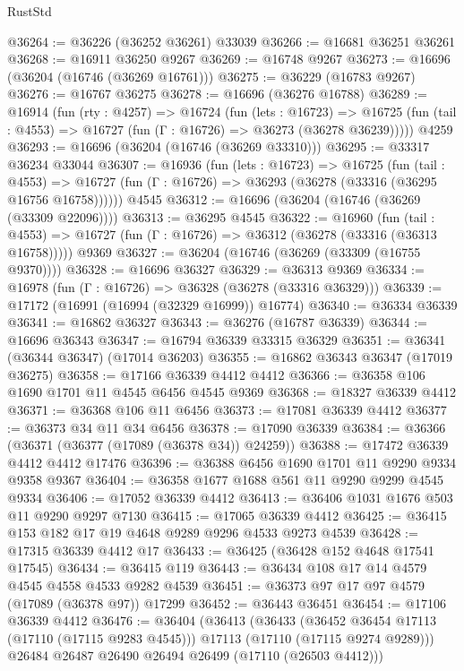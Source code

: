 \begin{lexlean}{RustStd}
\begin{coremodule}
@36264 := @36226 (@36252 @36261) @33039
@36266 := @16681 @36251 @36261
@36268 := @16911 @36250 @9267
@36269 := @16748 @9267
@36273 := @16696 (@36204 (@16746 (@36269 @16761)))
@36275 := @36229 (@16783 @9267)
@36276 := @16767 @36275
@36278 := @16696 (@36276 @16788)
@36289 := @16914
    (fun (rty : @4257) =>
    @16724
      (fun (lets : @16723) =>
      @16725 (fun (tail : @4553) => @16727 (fun (Γ : @16726) => @36273 (@36278 @36239)))))
    @4259
@36293 := @16696 (@36204 (@16746 (@36269 @33310)))
@36295 := @33317 @36234 @33044
@36307 := @16936
    (fun (lets : @16723) =>
    @16725
      (fun (tail : @4553) =>
      @16727 (fun (Γ : @16726) => @36293 (@36278 (@33316 (@36295 @16756 @16758))))))
    @4545
@36312 := @16696 (@36204 (@16746 (@36269 (@33309 @22096))))
@36313 := @36295 @4545
@36322 := @16960
    (fun (tail : @4553) => @16727 (fun (Γ : @16726) => @36312 (@36278 (@33316 (@36313 @16758)))))
    @9369
@36327 := @36204 (@16746 (@36269 (@33309 (@16755 @9370))))
@36328 := @16696 @36327
@36329 := @36313 @9369
@36334 := @16978 (fun (Γ : @16726) => @36328 (@36278 (@33316 @36329)))
@36339 := @17172 (@16991 (@16994 (@32329 @16999)) @16774)
@36340 := @36334 @36339
@36341 := @16862 @36327
@36343 := @36276 (@16787 @36339)
@36344 := @16696 @36343
@36347 := @16794 @36339 @33315 @36329
@36351 := @36341 (@36344 @36347) (@17014 @36203)
@36355 := @16862 @36343 @36347 (@17019 @36275)
@36358 := @17166 @36339 @4412 @4412
@36366 := @36358 @106 @1690 @1701 @11 @4545 @6456 @4545 @9369
@36368 := @18327 @36339 @4412
@36371 := @36368 @106 @11 @6456
@36373 := @17081 @36339 @4412
@36377 := @36373 @34 @11 @34 @6456
@36378 := @17090 @36339
@36384 := @36366 (@36371 (@36377 (@17089 (@36378 @34)) @24259))
@36388 := @17472 @36339 @4412 @4412 @17476
@36396 := @36388 @6456 @1690 @1701 @11 @9290 @9334 @9358 @9367
@36404 := @36358 @1677 @1688 @561 @11 @9290 @9299 @4545 @9334
@36406 := @17052 @36339 @4412
@36413 := @36406 @1031 @1676 @503 @11 @9290 @9297 @7130
@36415 := @17065 @36339 @4412
@36425 := @36415 @153 @182 @17 @19 @4648 @9289 @9296 @4533 @9273 @4539
@36428 := @17315 @36339 @4412 @17
@36433 := @36425 (@36428 @152 @4648 @17541 @17545)
@36434 := @36415 @119
@36443 := @36434 @108 @17 @14 @4579 @4545 @4558 @4533 @9282 @4539
@36451 := @36373 @97 @17 @97 @4579 (@17089 (@36378 @97)) @17299
@36452 := @36443 @36451
@36454 := @17106 @36339 @4412
@36476 := @36404
    (@36413
      (@36433
        (@36452 @36454 @17113 (@17110 (@17115 @9283 @4545)))
        @17113
        (@17110 (@17115 @9274 @9289)))
      @26484
      @26487
      @26490
      @26494
      @26499
      (@17110 (@26503 @4412)))

\end{coremodule}
\end{lexlean}
